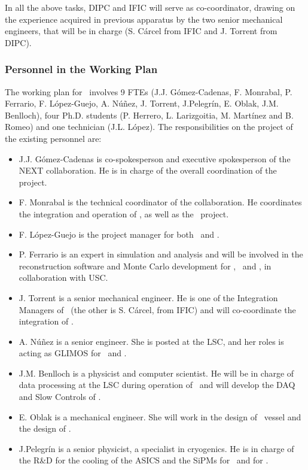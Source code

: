 
In all the above tasks, DIPC and IFIC will serve as co-coordinator, drawing on the experience acquired in previous apparatus by the two senior mechanical engineers, that will be in charge (S. C\'arcel from IFIC and J. Torrent from DIPC). 

\subsubsection*{Personnel in the Working Plan}
The working plan for \sDIPC\ involves 9 FTEs (J.J. G\'omez-Cadenas, F. Monrabal, P. Ferrario, F. L\'opez-Guejo, A. N\'u\~nez, J. Torrent, J.Pelegr\'in, E. Oblak, J.M. Benlloch), four Ph.D. students (P. Herrero, L. Larizgoitia, M. Mart\'inez and B. Romeo) and one technician (J.L. L\'opez). The responsibilities on the project of the existing personnel are:


\begin{itemize}[noitemsep,topsep=0pt,parsep=0pt,partopsep=0pt]
\item J.J. G\'omez-Cadenas is co-spokesperson and executive spokesperson of the NEXT collaboration. He is in charge of the overall coordination of the project. 
\item F. Monrabal is the technical coordinator of the collaboration. He coordinates the integration and operation of \Next, as well as the \HDEMO\ project.
\item  F. L\'opez-Guejo is the project manager  for both \Next\ and \NHD.
\item P. Ferrario is an expert in simulation and analysis and will be involved in the reconstruction software and Monte Carlo development for \Next, \HDEMO\ and \NHD, in collaboration with USC. 
\item J. Torrent is a senior mechanical engineer. He is one of the Integration Managers of \Next\ (the other is S. C\'arcel, from IFIC) and will co-coordinate the integration of \NHD. 
\item A. N\'u\~nez is a senior engineer. She is posted at the LSC, and her roles is acting as GLIMOS  for \Next\ and \NHD. 
\item J.M. Benlloch is a  physicist and computer scientist. He will be in charge of data processing at the LSC  during operation of \Next\ and will develop the DAQ and Slow Controls of \HDEMO.
\item E. Oblak is a  mechanical engineer. She  will work in the design of \NHD\ vessel and the design of \HDEMO.  
\item J.Pelegr\'in is a senior physicist, a specialist in cryogenics. He is in charge of the R\&D for the cooling of the ASICS and the SiPMs for \HDEMO\ and for \NHD. 
\end{itemize}

